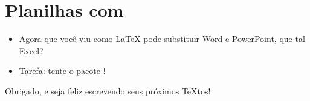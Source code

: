 \documentclass{beamer}
\begin{document}
\section{Planilhas com \protect{}}

\begin{frame}[fragile]{\insertsection}
\begin{itemize}
\item Agora que você viu como \LaTeX{} pode substituir  Word e PowerPoint, que tal Excel?
\item Tarefa: tente o pacote !
\end{itemize}
\end{frame}

\begin{frame}
\begin{center}
Obrigado, e seja feliz escrevendo seus próximos \TeX{}tos!
\end{center}
\end{frame}
\end{document}
